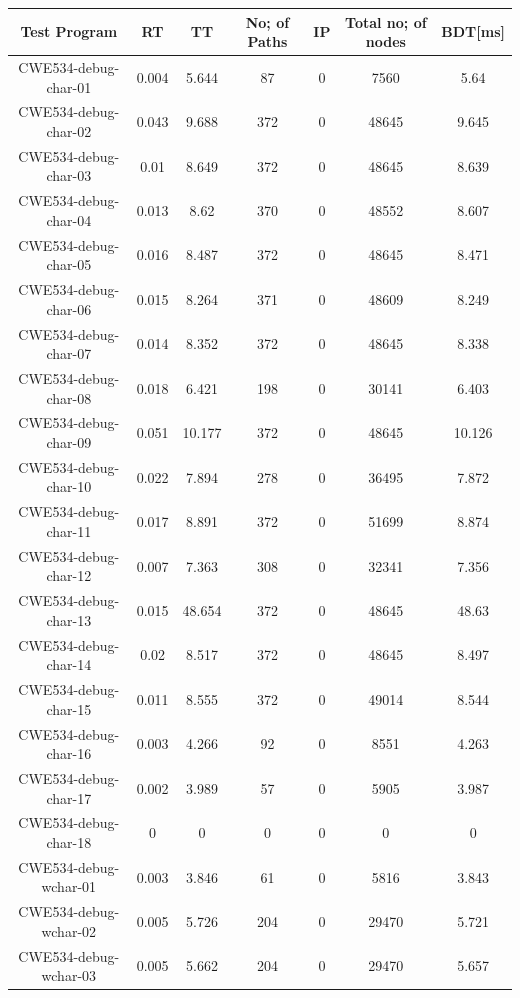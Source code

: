 \begin{table}[h!]
\centering
 \begin{tabular}{||c |c |c |c |c| c|c||} 
 \hline
 \textbf{Test Program} & \textbf{RT} & \textbf{TT} & \textbf{No; of Paths} & \textbf{IP}& \textbf{Total no; of nodes}& \textbf{BDT[ms]} \\ [0.5ex] 
 \hline\hline
 CWE534-debug-char-01 & 0.004 & 5.644 & 87 & 0& 7560&5.64 \\ 
 \hline
CWE534-debug-char-02 & 0.043 &  9.688 & 372&0& 48645&9.645 \\ 
 \hline
 CWE534-debug-char-03 & 0.01& 8.649 & 372&0& 48645&8.639 \\ 
 \hline
 CWE534-debug-char-04 & 0.013 & 8.62 & 370&0& 48552&8.607 \\ 
 \hline
 CWE534-debug-char-05 & 0.016 & 8.487 & 372&0& 48645&8.471 \\ 
 \hline
 CWE534-debug-char-06 & 0.015 & 8.264& 371&0& 48609&8.249 \\ 
 \hline
 CWE534-debug-char-07 & 0.014 & 8.352 & 372&0& 48645&8.338 \\ 
 \hline
 CWE534-debug-char-08 & 0.018 &6.421 & 198&0& 30141&6.403 \\ 
 \hline
 CWE534-debug-char-09 & 0.051 &10.177 &372&0& 48645&10.126 \\ 
 \hline
 CWE534-debug-char-10 & 0.022 & 7.894& 278&0&36495&7.872  \\ 
 \hline
 CWE534-debug-char-11 & 0.017 &8.891& 372&0&51699&8.874  \\ 
 \hline
 CWE534-debug-char-12 & 0.007 & 7.363 &308&0& 32341&7.356 \\ 
 \hline
 CWE534-debug-char-13 & 0.015 &48.654 & 372&0& 48645&48.63 \\ 
 \hline
 CWE534-debug-char-14 & 0.02 & 8.517 & 372&0& 48645&8.497 \\ 
 \hline
 CWE534-debug-char-15 & 0.011 & 8.555 & 372&0&49014&8.544 \\ 
 \hline
  CWE534-debug-char-16 & 0.003 &4.266 & 92&0& 8551&4.263 \\ 
 \hline
  CWE534-debug-char-17 & 0.002 & 3.989 & 57&0& 5905&3.987 \\ 
 \hline
  CWE534-debug-char-18 & 0 & 0 & 0&0& 0&0 \\ 
  \hline
  CWE534-debug-wchar-01 & 0.003 &3.846 &61 & 0& 5816& 3.843\\ 
 \hline
CWE534-debug-wchar-02 & 0.005 & 5.726 & 204&0& 29470& 5.721\\ 
 \hline
 CWE534-debug-wchar-03 & 0.005 &5.662 & 204&0& 29470& 5.657\\ 

\end{tabular}
\end{table}
